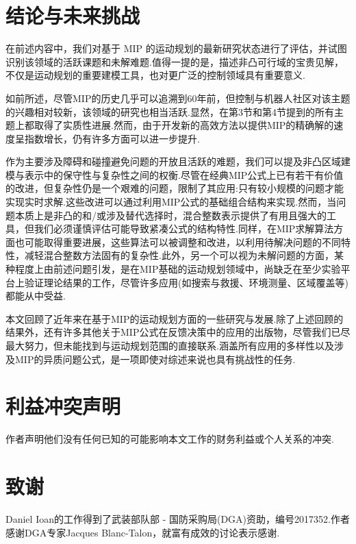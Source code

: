 \documentclass[10pt]{article}
\begin{document}
\section{结论与未来挑战}

在前述内容中，我们对基于 MIP 的运动规划的最新研究状态进行了评估，并试图识别该领域的活跃课题和未解难题.值得一提的是，描述非凸可行域的宝贵见解，不仅是运动规划的重要建模工具，也对更广泛的控制领域具有重要意义.

如前所述，尽管MIP的历史几乎可以追溯到60年前，但控制与机器人社区对该主题的兴趣相对较新，该领域的研究也相当活跃.显然，在第3节和第4节提到的所有主题上都取得了实质性进展.然而，由于开发新的高效方法以提供MIP的精确解的速度呈指数增长，仍有许多方面可以进一步提升.

作为主要涉及障碍和碰撞避免问题的开放且活跃的难题，我们可以提及非凸区域建模与表示中的保守性与复杂性之间的权衡.尽管在经典MIP公式上已有若干有价值的改进，但复杂性仍是一个艰难的问题，限制了其应用:只有较小规模的问题才能实现实时求解.这些改进可以通过利用MIP公式的基础组合结构来实现.然而，当问题本质上是非凸的和/或涉及替代选择时，混合整数表示提供了有用且强大的工具，但我们必须谨慎评估可能导致紧凑公式的结构特性.同样，在MIP求解算法方面也可能取得重要进展，这些算法可以被调整和改进，以利用待解决问题的不同特性，减轻混合整数方法固有的复杂性.此外，另一个可以视为未解问题的方面，某种程度上由前述问题引发，是在MIP基础的运动规划领域中，尚缺乏在至少实验平台上验证理论结果的工作，尽管许多应用(如搜索与救援、环境测量、区域覆盖等)都能从中受益.



本文回顾了近年来在基于MIP的运动规划方面的一些研究与发展.除了上述回顾的结果外，还有许多其他关于MIP公式在反馈决策中的应用的出版物，尽管我们已尽最大努力，但未能找到与运动规划范围的直接联系.涵盖所有应用的多样性以及涉及MIP的异质问题公式，是一项即使对综述来说也具有挑战性的任务.

\section*{利益冲突声明}

作者声明他们没有任何已知的可能影响本文工作的财务利益或个人关系的冲突.

\section*{致谢}

Daniel Ioan的工作得到了武装部队部 - 国防采购局(DGA)资助，编号2017352.作者感谢DGA专家Jacques Blanc-Talon，就富有成效的讨论表示感谢.
\end{document}
